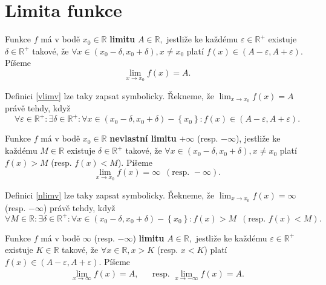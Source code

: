 \section{Limita funkce}
\begin{definition}\label{vlimv}
    Funkce $f$ má v bodě $x_0\in \mathbb R$ \textbf{limitu} $A\in \mathbb R,$
    jestliže ke každému $\varepsilon \in \mathbb R^+$ existuje
    $\delta \in \mathbb R^+$ takové, že $\forall x \in
    \left ( x_0-\delta, x_0+\delta \right ), x\ne x_0 $ platí $f(x)\in
    \left ( A-\varepsilon,A+\varepsilon \right ). $ Píšeme
    $$\lim_{x\to x_0}f(x)=A.$$
\end{definition}

\begin{pozn}
    Definici \ref{vlimv} lze taky zapsat symbolicky. Řekneme, že
    $\lim_{x\to x_0} f(x) =A$ právě tehdy, když
    $$
    \forall \varepsilon \in \mathbb R^+:
        \exists \delta \in \mathbb R^+: \forall x \in
        \left ( x_0-\delta,x_0+\delta \right )-\left \{ x_0 \right \}:
        f(x) \in \left ( A-\varepsilon, A+\varepsilon \right ).
    $$
\end{pozn}

\begin{definition}\label{nlimv}
Funkce $f$ má v bodě $x_0\in \mathbb R$ \textbf{nevlastní limitu} $+\infty$ (resp.
$-\infty$),
jestliže ke každému $M \in \mathbb R$ existuje
$\delta \in \mathbb R^+$ takové, že $\forall x \in
\left ( x_0-\delta, x_0+\delta \right ), x\ne x_0 $ platí $f(x)>M $
(resp. $f(x)<M$). Píšeme
$$\lim_{x\to x_0}f(x)=\infty \,\,\,(\textrm{resp. } -\infty).$$
\end{definition}

\begin{pozn}
    Definici \ref{nlimv} lze taky zapsat symbolicky. Řekneme, že
    $\lim_{x\to x_0} f(x) =\infty$ (resp. $-\infty$) právě tehdy, když
    $$
    \forall M \in \mathbb R:
        \exists \delta \in \mathbb R^+: \forall x \in
        \left ( x_0-\delta,x_0+\delta \right )-\left \{ x_0 \right \}:
        f(x) > M\,\,\, (\textrm{resp. } f(x) < M) .
    $$
\end{pozn}

\begin{definition}\label{vlimn}
Funkce $f$ má v bodě $\infty$ (resp. $-\infty$) \textbf{limitu} $A\in \mathbb R,$
jestliže ke každému $\varepsilon \in \mathbb R^+$ existuje
$K \in \mathbb R$ takové, že $\forall x \in \mathbb R, x > K$ (resp. $x<K$)
platí $f(x)\in \left ( A-\varepsilon,A+\varepsilon \right ). $ Píšeme
\begin{align*}
\lim_{x\to \infty}f(x)=A, & & \textrm{resp. } \lim_{x\to -\infty}f(x)=A.
\end{align*}
\end{definition}

